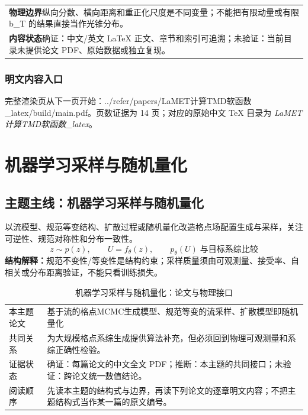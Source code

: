 \documentclass[UTF8,11pt,oneside]{ctexbook}
\begin{document}
\begin{table}[htbp]
\begin{tabular}{@{}p{}@{}}
    \textbf{物理边界}\quad 纵向分数、横向距离和重正化尺度是不同变量；不能把有限动量或有限 b\_T 的结果直接当作光锥分布。 \\
    \textbf{内容状态}\quad 确证：中文/英文 LaTeX 正文、章节和索引可追溯；未验证：当前目录未提供论文 PDF、原始数据或独立复现。 \\
    \bottomrule
  \end{tabular}
\end{table}
\section*{明文内容入口}
\noindent 完整渲染页从下一页开始：../\allowbreak{}refer/\allowbreak{}papers/\allowbreak{}LaMET计算TMD软函数\_\allowbreak{}latex/\allowbreak{}build/\allowbreak{}main.pdf。页数证据为 14 页；对应的原始中文 TeX 目录为 \emph{LaMET计算TMD软函数\_latex}。
\clearpage

\clearpage

\part{机器学习采样与随机量化}

\chapter*{主题主线：机器学习采样与随机量化}
以流模型、规范等变结构、扩散过程或随机量化改造格点场配置生成与采样，关注可逆性、规范对称性和分布一致性。
\begin{equation}
  z\sim p(z),\qquad U=f_\theta(z),\qquad p_\theta(U)\;\text{与目标系综比较}
\end{equation}
\noindent\textbf{结构解释：}规范不变性/等变性是结构约束；采样质量须由可观测量、接受率、自相关或分布距离验证，不能只看训练损失。
\begin{table}[htbp]
  \centering
  \caption{机器学习采样与随机量化：论文与物理接口}
  \small
  \begin{tabularx}{0.96\textwidth}{@{}p{3.3cm}>{\raggedright\arraybackslash}X@{}}
    \toprule
    本主题论文 & 基于流的格点MCMC生成模型、规范等变的流采样、扩散模型即随机量化 \\
    共同关系 & 为大规模格点系综生成提供算法补充，但必须回到物理可观测量和系综正确性检验。 \\
    证据状态 & 确证：每篇论文的中文全文 PDF；推断：本主题的共同接口；未验证：跨论文统一数值结论。 \\
    阅读顺序 & 先读本主题的结构式与边界，再读下列论文的逐章明文内容；不把主题结构式当作某一篇的原文编号。 \\
    \bottomrule
  \end{tabularx}
\end{table}
\end{document}
